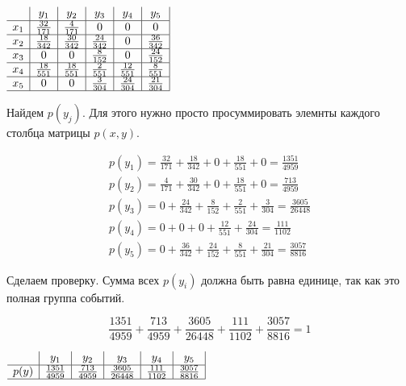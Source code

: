 \documentclass[a4paper,12pt]{article}
\begin{document}
\begin{table}[h]
$\begin{array}{c *{5}{|c} |}
& y_1 & y_2 & y_3 & y_4 & y_5 \\ \hline
x_1 & \frac{32}{171} & \frac{4}{171} & 0 & 0 & 0 \\ \hline
x_2 & \frac{18}{342} & \frac{30}{342} & \frac{24}{342} & 0 & \frac{36}{342} \\ \hline
x_3 & 0 & 0 & \frac{8}{152} & 0 & \frac{24}{152} \\ \hline
x_4 & \frac{18}{551} & \frac{18}{551} & \frac{2}{551} & \frac{12}{551} & \frac{8}{551} \\ \hline
x_5 & 0 & 0 & \frac{3}{304} & \frac{24}{304} & \frac{21}{304} \\ \hline
\end{array}$
\caption{$p(x, y)$}
\end{table}

Найдем $p(y_j)$.
Для этого нужно просто просуммировать элемнты каждого столбца матрицы $p(x, y)$.

\begin{gather*}
p(y_1) = \frac{32}{171} + \frac{18}{342} + 0 + \frac{18}{551} + 0 = \frac{1351}{4959} \\
p(y_2) = \frac{4}{171} + \frac{30}{342} + 0 + \frac{18}{551} + 0 = \frac{713}{4959} \\
p(y_3) = 0 + \frac{24}{342} + \frac{8}{152} + \frac{2}{551} + \frac{3}{304} = \frac{3605}{26448} \\
p(y_4) = 0 + 0 + 0 + \frac{12}{551} + \frac{24}{304} = \frac{111}{1102} \\
p(y_5) = 0 + \frac{36}{342} + \frac{24}{152} + \frac{8}{551} + \frac{21}{304} = \frac{3057}{8816}
\end{gather*}

Сделаем проверку.
Сумма всех $p(y_i)$ должна быть равна единице, так как это полная группа событий.

$$\frac{1351}{4959} + \frac{713}{4959} + \frac{3605}{26448} + \frac{111}{1102} + \frac{3057}{8816} = 1$$

\begin{table}[h]
$\begin{array}{c *{5}{|c} |}
& y_1 & y_2 & y_3 & y_4 & y_5 \\ \hline
p(y) & \frac{1351}{4959} & \frac{713}{4959} & \frac{3605}{26448} & \frac{111}{1102} & \frac{3057}{8816} \\ \hline
\end{array}$
\caption{$p(y)$}
\end{table}
\end{document}
